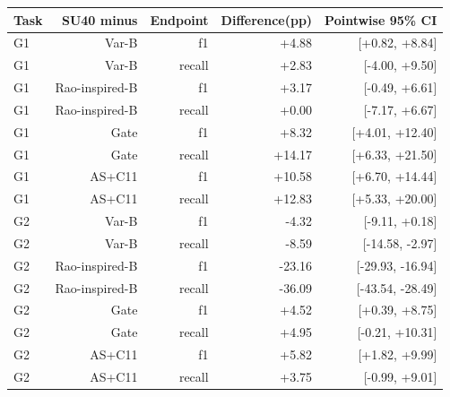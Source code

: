 \begingroup\small\setlength{\tabcolsep}{4pt}\renewcommand{\arraystretch}{1.1}\begin{tabular}{lrrrr}\toprule
Task & SU40 minus & Endpoint & Difference(pp) & Pointwise 95\% CI \\\midrule
G1 & Var-B & f1 & +4.88 & [+0.82, +8.84] \\
G1 & Var-B & recall & +2.83 & [-4.00, +9.50] \\
G1 & Rao-inspired-B & f1 & +3.17 & [-0.49, +6.61] \\
G1 & Rao-inspired-B & recall & +0.00 & [-7.17, +6.67] \\
G1 & Gate & f1 & +8.32 & [+4.01, +12.40] \\
G1 & Gate & recall & +14.17 & [+6.33, +21.50] \\
G1 & AS+C11 & f1 & +10.58 & [+6.70, +14.44] \\
G1 & AS+C11 & recall & +12.83 & [+5.33, +20.00] \\
G2 & Var-B & f1 & -4.32 & [-9.11, +0.18] \\
G2 & Var-B & recall & -8.59 & [-14.58, -2.97] \\
G2 & Rao-inspired-B & f1 & -23.16 & [-29.93, -16.94] \\
G2 & Rao-inspired-B & recall & -36.09 & [-43.54, -28.49] \\
G2 & Gate & f1 & +4.52 & [+0.39, +8.75] \\
G2 & Gate & recall & +4.95 & [-0.21, +10.31] \\
G2 & AS+C11 & f1 & +5.82 & [+1.82, +9.99] \\
G2 & AS+C11 & recall & +3.75 & [-0.99, +9.01] \\
\bottomrule\end{tabular}\endgroup
